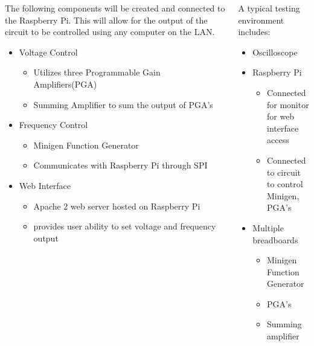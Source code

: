 \documentclass[25pt, a0paper, portrait, margin=0mm, innermargin=15mm, blockverticalspace=15mm, colspace=15mm, subcolspace=8mm]{tikzposter}
\begin{document}
\begin{columns}
{\begin{multicols}{2}
The following components will be created and connected to the Raspberry Pi.
This will allow for the output of the circuit to be controlled using any computer on the LAN.
\begin{itemize}
\item Voltage Control
  \begin{itemize}
  \item Utilizes three Programmable Gain Amplifiers(PGA)
  \item Summing Amplifier to sum the output of PGA's
  \end{itemize}
\item Frequency Control
  \begin{itemize}
  \item Minigen Function Generator
  \item Communicates with Raspberry Pi through SPI
  \end{itemize}
\item Web Interface
  \begin{itemize}
  \item Apache 2 web server hosted on Raspberry Pi
  \item provides user ability to set voltage and frequency output
  \end{itemize}
\end{itemize}

\end{multicols}
}

%
%
{
%
%
\begin{multicols}{2}



A typical testing environment includes:
\begin{itemize}
\item Oscilloscope
\item Raspberry Pi
  \begin{itemize}
  \item Connected for monitor for web interface access
  \item Connected to circuit to control Minigen, PGA's
  \end{itemize}
\item Multiple breadboards
  \begin{itemize}
  \item Minigen Function Generator
  \item PGA's
  \item Summing amplifier
  \end{itemize}
\end{itemize}


\end{multicols}}
\end{columns}
\end{document}
